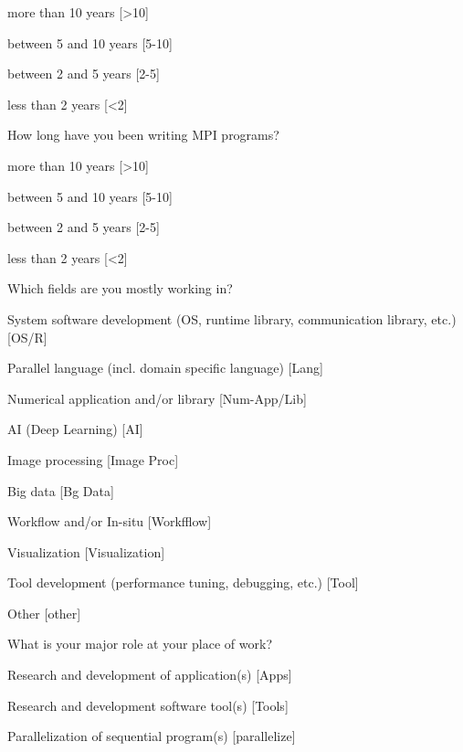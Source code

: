 \documentclass[conference,10pt,letterpaper]{IEEEtran}
\begin{document}
{{\begin{description}
    \begin{inparaenum}[{\bf C}1)]
    \item more than 10 years [\textgreater10]
    \item between 5 and 10 years [5-10]
    \item between 2 and 5 years [2-5]
    \item less than 2 years [\textless 2]
    \end{inparaenum}
  \item[Q6:] How long have you been writing MPI programs?
    \begin{inparaenum}[{\bf C}1)]
    \item more than 10 years [\textgreater10]
    \item between 5 and 10 years [5-10]
    \item between 2 and 5 years [2-5]
    \item less than 2 years [\textless 2]
    \end{inparaenum}
  \item[Q7*:] Which fields are you mostly working in?
    \begin{inparaenum}[{\bf C}1)]
    \item System software development (OS, runtime library, communication
      library, etc.) [OS/R]
    \item Parallel language (incl. domain specific language) [Lang]
    \item Numerical application and/or library [Num-App/Lib]
    \item AI (Deep Learning) [AI]
    \item Image processing [Image Proc]
    \item Big data [Bg Data]
    \item Workflow and/or In-situ [Workfflow]
    \item Visualization [Visualization]
    \item Tool development (performance tuning, debugging, etc.) [Tool]
    \item Other [other]
    \end{inparaenum}
  \item[Q8*:] What is your major role at your place of work?
    \begin{inparaenum}[{\bf C}1)]
    \item Research and development of application(s) [Apps]
    \item Research and development software tool(s) [Tools]
    \item Parallelization of sequential program(s) [parallelize]

\end{inparaenum}
\end{description}}}
\end{document}
